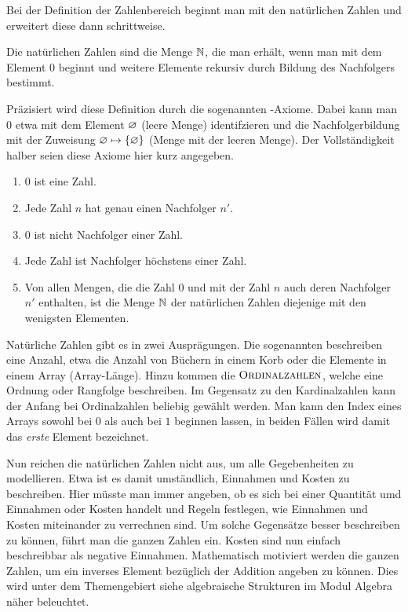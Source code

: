 Bei der Definition der Zahlenbereich beginnt man mit den natürlichen Zahlen und erweitert diese dann schrittweise.

\begin{definition}
	Die natürlichen Zahlen sind die Menge $\mathbb{N}$, die man erhält, wenn man mit dem Element $0$ beginnt und weitere Elemente rekursiv durch Bildung des Nachfolgers bestimmt.
\end{definition}

Präzisiert wird diese Definition durch die sogenannten -Axiome. Dabei kann man $0$ etwa mit dem Element $\varnothing$ (leere Menge) identifzieren und die Nachfolgerbildung mit der Zuweisung
$\varnothing \mapsto \lbrace \varnothing \rbrace$ (Menge mit der leeren Menge). Der Vollständigkeit halber seien diese Axiome hier kurz angegeben.

\begin{definition}
	\mbox{}
	\begin{enumerate}
		\item 0 ist eine Zahl.
		\item Jede Zahl $n$ hat genau einen Nachfolger $n'$.
		\item $0$ ist nicht Nachfolger einer Zahl.
		\item Jede Zahl ist Nachfolger höchstens einer Zahl.
		\item Von allen Mengen, die die Zahl $0$ und mit der Zahl $n$ auch deren Nachfolger $n'$ enthalten, ist die Menge $\mathbb{N}$ der natürlichen Zahlen diejenige mit den wenigsten Elementen.
	\end{enumerate}
\end{definition}

Natürliche Zahlen gibt es in zwei Ausprägungen. Die sogenannten  beschreiben eine Anzahl, etwa die Anzahl von Büchern in einem Korb oder die Elemente in einem Array (Array-Länge).
Hinzu kommen die $\textsc{Ordinalzahlen}$, welche eine Ordnung oder Rangfolge beschreiben. Im Gegensatz zu den Kardinalzahlen kann der Anfang bei Ordinalzahlen beliebig gewählt werden. Man kann den Index eines
Arrays sowohl bei $0$ als auch bei $1$ beginnen lassen, in beiden Fällen wird damit das \emph{erste} Element bezeichnet.

Nun reichen die natürlichen Zahlen nicht aus, um alle Gegebenheiten zu modellieren. Etwa ist es damit umständlich, Einnahmen und Kosten zu beschreiben. Hier müsste man immer angeben, ob es sich bei einer Quantität umd Einnahmen oder Kosten handelt und Regeln festlegen, wie Einnahmen und Kosten miteinander zu verrechnen sind. Um solche Gegensätze besser beschreiben zu können, führt man die ganzen Zahlen ein.
Kosten sind nun einfach beschreibbar als negative Einnahmen. Mathematisch motiviert werden die ganzen Zahlen, um ein inverses Element bezüglich der Addition angeben zu können. Dies wird unter dem Themengebiert siehe algebraische Strukturen im Modul Algebra näher beleuchtet.

